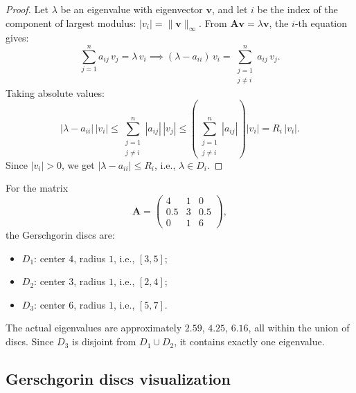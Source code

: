 \begin{proof}
Let $\lambda$ be an eigenvalue with eigenvector $\mathbf{v}$, and let $i$ be the index of the component of largest modulus: $|v_i| = \|\mathbf{v}\|_\infty$. From $\mathbf{A}\mathbf{v} = \lambda\mathbf{v}$, the $i$-th equation gives:
\[
    \sum_{j=1}^{n} a_{ij}\,v_j = \lambda\,v_i \implies (\lambda - a_{ii})\,v_i = \sum_{\substack{j=1 \\ j \neq i}}^{n} a_{ij}\,v_j.
\]
Taking absolute values:
\[
    |\lambda - a_{ii}|\,|v_i| \leq \sum_{\substack{j=1 \\ j \neq i}}^{n} |a_{ij}|\,|v_j| \leq \left(\sum_{\substack{j=1 \\ j \neq i}}^{n} |a_{ij}|\right)|v_i| = R_i\,|v_i|.
\]
Since $|v_i| > 0$, we get $|\lambda - a_{ii}| \leq R_i$, i.e., $\lambda \in D_i$.
\end{proof}

\begin{example}
\label{ex:gerschgorin}
For the matrix
\[
    \mathbf{A} = \begin{pmatrix} 4 & 1 & 0 \\ 0.5 & 3 & 0.5 \\ 0 & 1 & 6 \end{pmatrix},
\]
the Gerschgorin discs are:
\begin{itemize}
    \item $D_1$: center $4$, radius $1$, i.e., $[3, 5]$;
    \item $D_2$: center $3$, radius $1$, i.e., $[2, 4]$;
    \item $D_3$: center $6$, radius $1$, i.e., $[5, 7]$.
\end{itemize}
The actual eigenvalues are approximately $2.59$, $4.25$, $6.16$, all within the union of discs. Since $D_3$ is disjoint from $D_1 \cup D_2$, it contains exactly one eigenvalue.
\end{example}

\subsection{Gerschgorin discs visualization}

